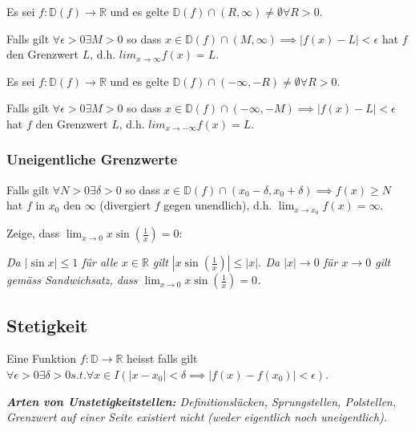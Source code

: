 Es sei $f: \mathbb{D}(f) \rightarrow \mathbb{R}$ und es gelte $\mathbb{D}(f) \cap (R, \infty) \neq \emptyset \forall R > 0$.

Falls gilt $\forall \epsilon > 0 \exists M > 0$ so dass $x \in \mathbb{D}(f) \cap (M, \infty) \implies |f(x) - L| < \epsilon$ hat $f$  den Grenzwert $L$, d.h. $lim_{x \rightarrow \infty} f(x)=L$.

Es sei $f: \mathbb{D}(f) \rightarrow \mathbb{R}$ und es gelte $\mathbb{D}(f) \cap (- \infty, -R) \neq \emptyset \forall R > 0$.

Falls gilt $\forall \epsilon > 0 \exists M > 0$ so dass $x \in \mathbb{D}(f) \cap (-\infty, -M) \implies |f(x) - L| < \epsilon$ hat $f$  den Grenzwert $L$, d.h. $lim_{x \rightarrow - \infty} f(x)=L$.

\subsubsection{Uneigentliche Grenzwerte}

Falls gilt $\forall N > 0 \exists \delta > 0$ so dass $x \in \mathbb{D}(f) \cap (x_0 - \delta, x_0 + \delta) \implies f(x) \geq N$ hat $f$ in $x_0$ den  $\infty$ (divergiert $f$ gegen unendlich), d.h. $\lim_{x \rightarrow x_0} f(x) = \infty$.

\begin{exercise}
    Zeige, dass $\lim_{x \rightarrow 0} x \sin(\frac{1}{x}) = 0$:

    \textit{Da $|\sin x| \leq 1$ für alle $x \in \mathbb{R}$ gilt $|x \sin (\frac{1}{x})|\leq |x|$. Da $|x| \rightarrow 0$ für $x \rightarrow 0$ gilt gemäss Sandwichsatz, dass $\lim_{x \rightarrow 0} x \sin (\frac{1}{x})=0$.}
\end{exercise}

\subsection{Stetigkeit}

Eine Funktion $f : \mathbb{D} \rightarrow \mathbb{R}$ heisst  falls gilt $\forall \epsilon > 0 \exists \delta > 0 s.t. \forall x \in I (|x - x_0| < \delta \implies |f(x) - f(x_0)| < \epsilon)$.

\textit{\textbf{Arten von Unstetigkeitstellen:} Definitionslücken, Sprungstellen, Polstellen, Grenzwert auf einer Seite existiert nicht (weder eigentlich noch uneigentlich).}

